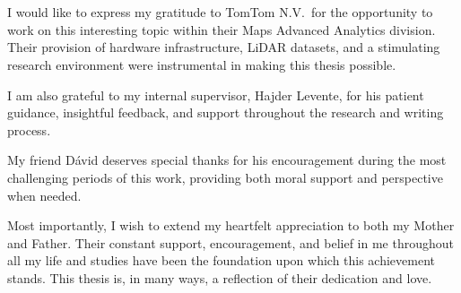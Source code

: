 \documentclass[
]{elteikthesis}[2024/04/26]
\newif\ifUPM
\begin{document}
\chapter*{\acklabel}

I would like to express my gratitude to TomTom N.V.~for the opportunity to work on this interesting topic within their Maps Advanced Analytics division.
Their provision of hardware infrastructure, LiDAR datasets, and a stimulating research environment were instrumental in making this thesis possible.

\ifUPM\else
I am also grateful to my internal supervisor, Hajder Levente, for his patient guidance, insightful feedback, and support throughout the research and writing process.

My friend Dávid deserves special thanks for his encouragement during the most challenging periods of this work, providing both moral support and perspective when needed.

\fi
Most importantly, I wish to extend my heartfelt appreciation to both my Mother and Father.
Their constant support, encouragement, and belief in me throughout all my life and studies have been the foundation upon which this achievement stands.
This thesis is, in many ways, a reflection of their dedication and love.


\appendix
% 

{}
\printbibliography[title=\biblabel]
\cleardoublepage





\end{document}
